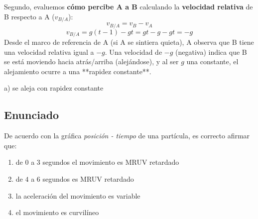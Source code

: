 \documentclass[12pt, a4paper]{article}
\begin{document}
Segundo, evaluemos \textbf{cómo percibe A a B} calculando la \textbf{velocidad relativa} de B respecto a A ($v_{B/A}$):
$$ v_{B/A} = v_B - v_A $$
$$ v_{B/A} = g(t-1) - gt = gt - g - gt = -g $$
Desde el marco de referencia de A (si A se sintiera quieta), A observa que B tiene una velocidad relativa igual a $-g$. Una velocidad de $-g$ (negativa) indica que B se está moviendo hacia atrás/arriba (alejándose), y al ser $g$ una constante, el alejamiento ocurre a una **rapidez constante**.

\begin{tcolorbox}[colback=green!5!white, colframe=green!50!black, title=Respuesta Final]
\centering \Large a) se aleja con rapidez constante
\end{tcolorbox}

\newpage

\subsection*{Enunciado}
De acuerdo con la gráfica \textit{posición - tiempo} de una partícula, es correcto afirmar que:

\begin{center}
\end{center}

\begin{enumerate}[label=\alph*)]
    \item de $0$ a $3$ segundos el movimiento es MRUV retardado
    \item de $4$ a $6$ segundos es MRUV retardado
    \item la aceleración del movimiento es variable
    \item el movimiento es curvilíneo
\end{enumerate}
\end{document}
